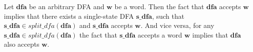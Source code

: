 \begin{theorem}
  Let $\boldsymbol{dfa}$ be an arbitrary DFA and $\boldsymbol{w}$ be a word. Then the fact that $\boldsymbol{dfa}$ accepts $\boldsymbol{w}$ implies that there exists a single-state DFA $\boldsymbol{s\_dfa}$, such that $\boldsymbol{s\_dfa} \in split\_dfa(\boldsymbol{dfa})$ and $\boldsymbol{s\_dfa}$ accepts $\boldsymbol{w}$. And vice versa, for any $\boldsymbol{s\_dfa} \in split\_dfa(\boldsymbol{dfa})$ the fact that $\boldsymbol{s\_dfa}$ accepts a word $\boldsymbol{w}$ implies that $\boldsymbol{dfa}$ also accepts $\boldsymbol{w}$.
\end{theorem}

%


